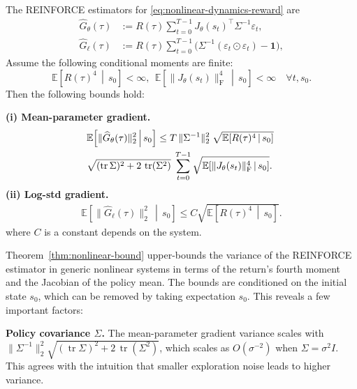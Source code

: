 \begin{theorem}
\label{thm:nonlinear-bound}
The REINFORCE estimators for \eqref{eq:nonlinear-dynamics-reward} are
\begin{align}
\widehat G_\theta(\tau)
&:= R(\tau)\sum_{t=0}^{T-1} J_\theta(s_t)^\top \Sigma^{-1}\varepsilon_t,
\label{eq:gtheta_def}\\
\widehat G_\ell(\tau)
&:= R(\tau)\sum_{t=0}^{T-1}\Big( \Sigma^{-1}(\varepsilon_t\odot\varepsilon_t) - \mathbf 1\Big),
\label{eq:gell_def}
\end{align}
Assume the following conditional moments are finite:
\[
\mathbb E\!\left[R(\tau)^4\,\middle|\, s_0\right]<\infty,
~~
\mathbb E\!\left[\|J_\theta(s_t)\|_{\mathrm{F}}^4\,\middle|\, s_0\right]<\infty\quad \forall t, s_0.
\]
Then the following bounds hold:

\textbf{(i) Mean-parameter gradient.}
\begin{align}
\label{eq:E2_theta}
&\mathbb E\!\left[\|\widehat G_\theta(\tau)\|_2^2 \,\middle|\, s_0\right]
\le
T\,\|\Sigma^{-1}\|_2^2\;
\sqrt{\mathbb E\!\left[R(\tau)^4\,\middle|\, s_0\right]}\;\notag \\
&\sqrt{(\operatorname{tr}\Sigma)^2 + 2\,\operatorname{tr}(\Sigma^2)}\;\sum_{t=0}^{T-1} \sqrt{\mathbb E\!\left[\|J_\theta(s_t)\|_{\mathrm{F}}^4\,\middle|\, s_0\right]}.
\end{align}
\textbf{(ii) Log-std gradient.}
\begin{align}
\label{eq:E2_ell}
\mathbb E\!\left[\|\widehat G_\ell(\tau)\|_2^2 \,\middle|\, s_0\right]
\le
C\sqrt{\mathbb E\!\left[R(\tau)^4\,\middle|\, s_0\right]}.
\end{align}
where $C$ is a constant depends on the system.
\vspace{-2mm}
\end{theorem}
Theorem~\ref{thm:nonlinear-bound} upper-bounds the variance of the REINFORCE estimator in generic nonlinear systems in terms of the return's fourth moment and the Jacobian of the policy mean. The bounds are conditioned on the initial state $s_0$, which can be removed by taking expectation \wrt $s_0$. This reveals a few important factors:

\textbf{Policy covariance $\Sigma$.} The mean-parameter gradient variance scales with $\|\Sigma^{-1}\|_2^2\sqrt{(\operatorname{tr}\Sigma)^2 + 2\,\operatorname{tr}(\Sigma^2)}$, which scales as $O(\sigma^{-2})$ when $\Sigma=\sigma^2 I$. This agrees with the intuition that smaller exploration noise leads to higher variance.

